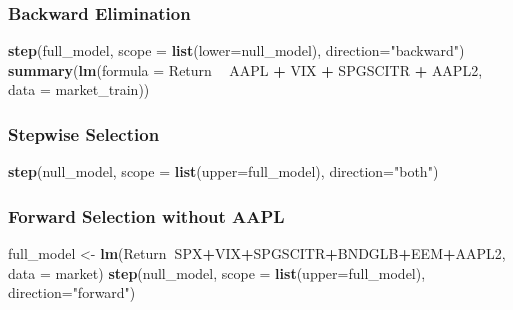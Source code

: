 \documentclass[]{article}
\newenvironment{Shaded}{\begin{snugshade}}{\end{snugshade}}
\newcommand{\KeywordTok}[1]{\textcolor[rgb]{0.13,0.29,0.53}{\textbf{#1}}}
\newcommand{\DataTypeTok}[1]{\textcolor[rgb]{0.13,0.29,0.53}{#1}}
\newcommand{\StringTok}[1]{\textcolor[rgb]{0.31,0.60,0.02}{#1}}
\newcommand{\OperatorTok}[1]{\textcolor[rgb]{0.81,0.36,0.00}{\textbf{#1}}}
\newcommand{\NormalTok}[1]{#1}
\begin{document}
\subsubsection{Backward Elimination}\label{backward-elimination}

\begin{Shaded}
\begin{Highlighting}[]
\KeywordTok{step}\NormalTok{(full_model, }\DataTypeTok{scope =} \KeywordTok{list}\NormalTok{(}\DataTypeTok{lower=}\NormalTok{null_model), }\DataTypeTok{direction=}\StringTok{"backward"}\NormalTok{)}
\KeywordTok{summary}\NormalTok{(}\KeywordTok{lm}\NormalTok{(}\DataTypeTok{formula =}\NormalTok{ Return }\OperatorTok{~}\StringTok{ }\NormalTok{AAPL }\OperatorTok{+}\StringTok{ }\NormalTok{VIX }\OperatorTok{+}\StringTok{ }\NormalTok{SPGSCITR }\OperatorTok{+}\StringTok{ }\NormalTok{AAPL2, }\DataTypeTok{data =}\NormalTok{ market_train))}
\end{Highlighting}
\end{Shaded}

\subsubsection{Stepwise Selection}\label{stepwise-selection}

\begin{Shaded}
\begin{Highlighting}[]
\KeywordTok{step}\NormalTok{(null_model, }\DataTypeTok{scope =} \KeywordTok{list}\NormalTok{(}\DataTypeTok{upper=}\NormalTok{full_model), }\DataTypeTok{direction=}\StringTok{"both"}\NormalTok{)}
\end{Highlighting}
\end{Shaded}

\subsubsection{Forward Selection without
AAPL}\label{forward-selection-without-aapl}

\begin{Shaded}
\begin{Highlighting}[]
\NormalTok{full_model <-}\StringTok{ }\KeywordTok{lm}\NormalTok{(Return}\OperatorTok{~}\NormalTok{SPX}\OperatorTok{+}\NormalTok{VIX}\OperatorTok{+}\NormalTok{SPGSCITR}\OperatorTok{+}\NormalTok{BNDGLB}\OperatorTok{+}\NormalTok{EEM}\OperatorTok{+}\NormalTok{AAPL2, }\DataTypeTok{data =}\NormalTok{ market)}
\KeywordTok{step}\NormalTok{(null_model, }\DataTypeTok{scope =} \KeywordTok{list}\NormalTok{(}\DataTypeTok{upper=}\NormalTok{full_model), }\DataTypeTok{direction=}\StringTok{"forward"}\NormalTok{)}
\end{Highlighting}
\end{Shaded}
\end{document}
